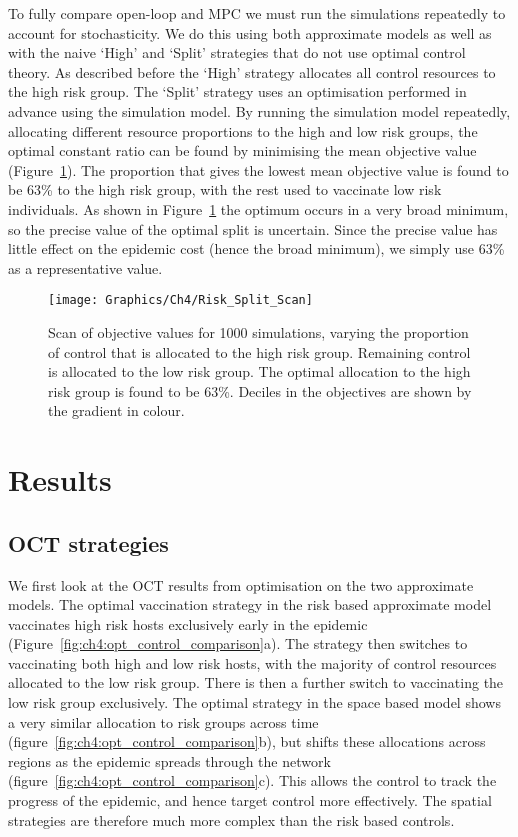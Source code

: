 To fully compare open-loop and MPC we must run the simulations repeatedly to account for stochasticity. We do this using both approximate models as well as with the naive `High' and `Split' strategies that do not use optimal control theory. As described before the `High' strategy allocates all control resources to the high risk group. The `Split' strategy uses an optimisation performed in advance using the simulation model. By running the simulation model repeatedly, allocating different resource proportions to the high and low risk groups, the optimal constant ratio can be found by minimising the mean objective value (Figure~\ref{fig:ch4:risk_split_scan}). The proportion that gives the lowest mean objective value is found to be 63\% to the high risk group, with the rest used to vaccinate low risk individuals. As shown in Figure~\ref{fig:ch4:risk_split_scan} the optimum occurs in a very broad minimum, so the precise value of the optimal split is uncertain. Since the precise value has little effect on the epidemic cost (hence the broad minimum), we simply use 63\% as a representative value.

\begin{figure}[h]
    \begin{center}
        \texttt{[image: Graphics/Ch4/Risk\_Split\_Scan]}
        \caption{Scan of objective values for 1000 simulations, varying the proportion of control that is allocated to the high risk group. Remaining control is allocated to the low risk group. The optimal allocation to the high risk group is found to be 63\%. Deciles in the objectives are shown by the gradient in colour.}
        \label{fig:ch4:risk_split_scan}
    \end{center}
\end{figure}

\FloatBarrier
\newpage
\section{Results\label{sec:ch4:Results}}

\subsection{OCT strategies}

We first look at the OCT results from optimisation on the two approximate models. The optimal vaccination strategy in the risk based approximate model vaccinates high risk hosts exclusively early in the epidemic (Figure~\ref{fig:ch4:opt_control_comparison}a). The strategy then switches to vaccinating both high and low risk hosts, with the majority of control resources allocated to the low risk group. There is then a further switch to vaccinating the low risk group exclusively. The optimal strategy in the space based model shows a very similar allocation to risk groups across time (figure~\ref{fig:ch4:opt_control_comparison}b), but shifts these allocations across regions as the epidemic spreads through the network (figure~\ref{fig:ch4:opt_control_comparison}c). This allows the control to track the progress of the epidemic, and hence target control more effectively. The spatial strategies are therefore much more complex than the risk based controls.

